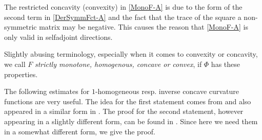 \begin{rem}The restricted concavity (convexity) in \eqref{MonoF-A} is due to the form of the second term in \eqref{DerSymmFct-A} and the fact that the trace of the square a non-symmetric matrix may be negative. This causes the reason that \eqref{MonoF-A} is only valid in selfadjoint directions.
\end{rem}

\begin{rem}
Slightly abusing terminology, especially when it comes to convexity or concavity, we call $F$ {\it{strictly monotone, homogenous, concave or convex}}, if $\Phi$ has these properties.
\end{rem}

The following estimates for $1$-homogeneous resp. inverse concave curvature functions are very useful. The idea for the first statement comes from \cite[Thm.~2.3]{Andrews:/2007} and also appeared in a similar form in \cite[Lemma~14]{BIS1}. The proof for the second statement, however appearing in a slightly different form, can be found in \cite[p.~112]{Urbas:/1991}. Since here we need them in a somewhat different form, we give the proof.

{}

